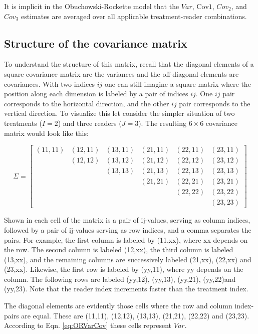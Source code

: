 \documentclass[
]{book}
\begin{document}
It is implicit in the Obuchowski-Rockette model that the \(Var\), \(\text{Cov1}\), \(Cov_2\), and \(Cov_3\) estimates are averaged over all applicable treatment-reader combinations.

\hypertarget{StrCovMatrix}{%
\subsection{Structure of the covariance matrix}\label{StrCovMatrix}}

To understand the structure of this matrix, recall that the diagonal elements of a square covariance matrix are the variances and the off-diagonal elements are covariances. With two indices \(ij\) one can still imagine a square matrix where the position along each dimension is labeled by a pair of indices \(ij\). One \(ij\) pair corresponds to the horizontal direction, and the other \(ij\) pair corresponds to the vertical direction. To visualize this let consider the simpler situation of two treatments (\(I = 2\)) and three readers (\(J = 3\)). The resulting \(6 \times 6\) covariance matrix would look like this:

\[
\Sigma=
\begin{bmatrix}
(11,11) & (12,11) & (13,11) & (21,11) & (22,11) & (23,11) \\
& (12,12) & (13,12) & (21,12) & (22,12) & (23,12) \\ 
& & (13,13) & (21,13) & (22,13) & (23,13) \\ 
& & & (21,21) & (22,21) & (23,21) \\
& & & & (22,22) & (23,22) \\ 
& & & & & (23,23)
\end{bmatrix}
\]

Shown in each cell of the matrix is a pair of ij-values, serving as column indices, followed by a pair of ij-values serving as row indices, and a comma separates the pairs. For example, the first column is labeled by (11,xx), where xx depends on the row. The second column is labeled (12,xx), the third column is labeled (13,xx), and the remaining columns are successively labeled (21,xx), (22,xx) and (23,xx). Likewise, the first row is labeled by (yy,11), where yy depends on the column. The following rows are labeled (yy,12), (yy,13), (yy,21), (yy,22)and (yy,23). Note that the reader index increments faster than the treatment index.

The diagonal elements are evidently those cells where the row and column index-pairs are equal. These are (11,11), (12,12), (13,13), (21,21), (22,22) and (23,23). According to Eqn. \eqref{eq:ORVarCov} these cells represent \(Var\).
\end{document}
